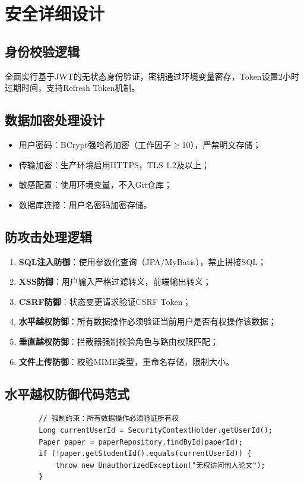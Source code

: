 \documentclass{../template/softeng}
\begin{document}
	\section{安全详细设计}

	\subsection{身份校验逻辑}
	全面实行基于JWT的无状态身份验证，密钥通过环境变量密存，Token设置2小时过期时间，支持Refresh Token机制。

	\subsection{数据加密处理设计}
	\begin{itemize}
		\item 用户密码：BCrypt强哈希加密（工作因子$\ge$10），严禁明文存储；
		\item 传输加密：生产环境启用HTTPS，TLS 1.2及以上；
		\item 敏感配置：使用环境变量，不入Git仓库；
		\item 数据库连接：用户名密码加密存储。
	\end{itemize}

	\subsection{防攻击处理逻辑}
	\begin{enumerate}
		\item \textbf{SQL注入防御}：使用参数化查询（JPA/MyBatis），禁止拼接SQL；
		\item \textbf{XSS防御}：用户输入严格过滤转义，前端输出转义；
		\item \textbf{CSRF防御}：状态变更请求验证CSRF Token；
		\item \textbf{水平越权防御}：所有数据操作必须验证当前用户是否有权操作该数据；
		\item \textbf{垂直越权防御}：拦截器强制校验角色与路由权限匹配；
		\item \textbf{文件上传防御}：校验MIME类型，重命名存储，限制大小。
	\end{enumerate}

	\subsection{水平越权防御代码范式}
	\begin{verbatim}
		// 强制约束：所有数据操作必须验证所有权
		Long currentUserId = SecurityContextHolder.getUserId();
		Paper paper = paperRepository.findById(paperId);
		if (!paper.getStudentId().equals(currentUserId)) {
			throw new UnauthorizedException("无权访问他人论文");
		}
	\end{verbatim}
\end{document}
